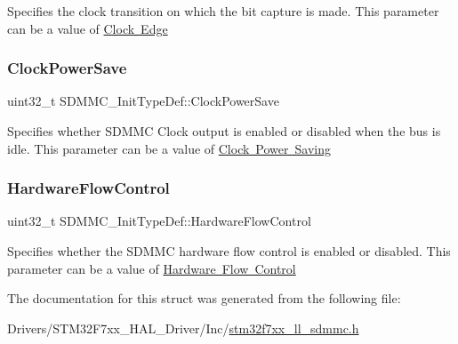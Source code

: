 Specifies the clock transition on which the bit capture is made. This parameter can be a value of \mbox{\hyperlink{group___s_d_m_m_c___l_l___clock___edge}{Clock Edge}} \mbox{\label{struct_s_d_m_m_c___init_type_def_a7336635628d6818a05abe74f92ca6323}} 
\subsubsection{\texorpdfstring{ClockPowerSave}{ClockPowerSave}}
{\footnotesize\ttfamily uint32\+\_\+t S\+D\+M\+M\+C\+\_\+\+Init\+Type\+Def\+::\+Clock\+Power\+Save}

Specifies whether S\+D\+M\+MC Clock output is enabled or disabled when the bus is idle. This parameter can be a value of \mbox{\hyperlink{group___s_d_m_m_c___l_l___clock___power___save}{Clock Power Saving}} \mbox{\label{struct_s_d_m_m_c___init_type_def_aa03b90f33a100609508a929e9fb2edc1}} 
\subsubsection{\texorpdfstring{HardwareFlowControl}{HardwareFlowControl}}
{\footnotesize\ttfamily uint32\+\_\+t S\+D\+M\+M\+C\+\_\+\+Init\+Type\+Def\+::\+Hardware\+Flow\+Control}

Specifies whether the S\+D\+M\+MC hardware flow control is enabled or disabled. This parameter can be a value of \mbox{\hyperlink{group___s_d_m_m_c___l_l___hardware___flow___control}{Hardware Flow Control}} 

The documentation for this struct was generated from the following file\+:\begin{DoxyCompactItemize}
\item 
Drivers/\+S\+T\+M32\+F7xx\+\_\+\+H\+A\+L\+\_\+\+Driver/\+Inc/\mbox{\hyperlink{stm32f7xx__ll__sdmmc_8h}{stm32f7xx\+\_\+ll\+\_\+sdmmc.\+h}}\end{DoxyCompactItemize}
